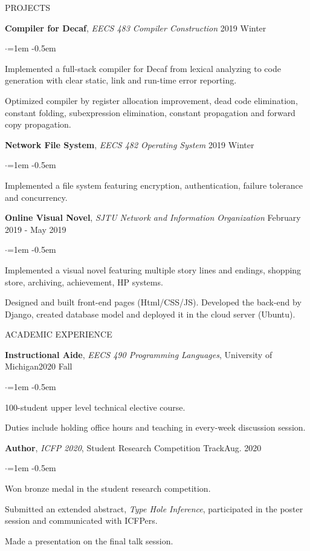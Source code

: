 \documentclass{resume} %
\newcommand{\rrsection}[5]{%
 {\textbf{#1}, }{\textit{#2},} {#3}\hfill{#4} \noindent
  \begin{list}{$\cdot$}{\leftmargin=1em}
   \itemsep -0.5em \vspace{-0.5em} 
  #5
  \end{list}
  \vspace{-0.5em} 
}
\newcommand{\project}[4]{%
 {\textbf{#1}, }{\textit{#2}} \hfill{#3} \noindent
  \begin{list}{$\cdot$}{\leftmargin=1em}
   \itemsep -0.5em \vspace{-0.5em} 
  #4
  \end{list}
  \vspace{-0.5em} 
}
\begin{document}
\begin{rSection}{PROJECTS}

\project{Compiler for Decaf}{EECS 483
  Compiler Construction}{2019 Winter}{
  \item Implemented a full-stack compiler for Decaf from lexical analyzing to code generation with clear static, link and run-time error reporting.
  \item Optimized compiler by register allocation improvement, dead code elimination, constant folding, subexpression elimination, constant propagation and forward copy propagation.
}

\project{Network File System}{EECS 482
  Operating System}{2019 Winter}{
  \item Implemented a file system featuring encryption, authentication, failure tolerance and concurrency.
}

\project{Online Visual Novel}{SJTU Network and Information Organization}{February 2019 - May 2019}{
	\item Implemented a visual novel featuring multiple story lines and endings, shopping store, archiving, achievement, HP systems.
  \item Designed and built front-end pages (Html/CSS/JS). Developed the back-end by Django, created database model and deployed it in the cloud server (Ubuntu).
}



\end{rSection}

\begin{rSection}{ACADEMIC EXPERIENCE}

\rrsection{Instructional Aide}{EECS 490 Programming Languages}{University
  of Michigan}{2020 Fall}{
  \item 100-student upper level technical elective course.
  \item Duties include holding office hours and teaching in every-week discussion session.
}

\rrsection{Author}{ICFP 2020}{Student Research Competition Track}{Aug. 2020}{
  \item Won bronze medal in the student research competition.
  \item Submitted an extended abstract, \textit{Type Hole Inference}, participated in the poster session and communicated with ICFPers.
  \item Made a presentation on the final talk session.
}

\end{rSection}
\end{document}
